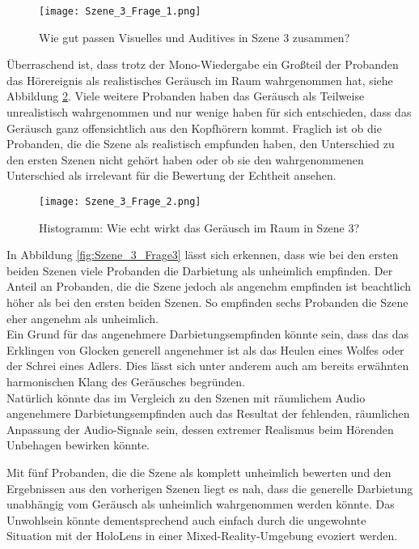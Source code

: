    \begin{figure}[H]
\centering
\texttt{[image: Szene\_3\_Frage\_1.png]}
\caption{Wie gut passen Visuelles und Auditives in Szene 3 zusammen?}
\label{fig:Szene_3_Frage1}
\end{figure} 

Überraschend ist, dass trotz der Mono-Wiedergabe ein Großteil der Probanden das Hörereignis als realistisches Geräusch im Raum wahrgenommen hat, siehe Abbildung \ref{fig:Szene_3_Frage2}. Viele weitere Probanden haben das Geräusch als Teilweise unrealistisch wahrgenommen und nur wenige haben für sich entschieden, dass das Geräusch ganz offensichtlich aus den Kopfhörern kommt. Fraglich ist ob die Probanden, die die Szene als realistisch empfunden haben, den Unterschied zu den ersten Szenen nicht gehört haben oder ob sie den wahrgenommenen Unterschied als irrelevant für die Bewertung der Echtheit ansehen. 

   \begin{figure}[H]
\centering
\texttt{[image: Szene\_3\_Frage\_2.png]}
\caption{Histogramm: Wie echt wirkt das Geräusch im Raum in Szene 3?}
\label{fig:Szene_3_Frage2}
\end{figure} 

In Abbildung \ref{fig:Szene_3_Frage3} lässt sich erkennen, dass wie bei den ersten beiden Szenen viele Probanden die Darbietung als unheimlich empfinden. Der Anteil an Probanden, die die Szene jedoch als angenehm empfinden ist beachtlich höher als bei den ersten beiden Szenen. So empfinden sechs Probanden die Szene eher angenehm als unheimlich. \\

Ein Grund für das angenehmere Darbietungsempfinden könnte sein, dass das das Erklingen von Glocken generell angenehmer ist als das Heulen eines Wolfes oder der Schrei eines Adlers. Dies lässt sich unter anderem auch am bereits erwähnten harmonischen Klang des Geräusches  begründen.  \\

Natürlich könnte das im Vergleich zu den Szenen mit räumlichem Audio angenehmere Darbietungsempfinden auch das Resultat der fehlenden, räumlichen Anpassung der Audio-Signale sein, dessen extremer Realismus beim Hörenden Unbehagen bewirken könnte.

Mit fünf Probanden, die die Szene als komplett unheimlich bewerten und den Ergebnissen aus den vorherigen Szenen liegt es nah, dass die generelle Darbietung unabhängig vom Geräusch als unheimlich wahrgenommen werden könnte. Das Unwohlsein könnte dementsprechend auch einfach durch die ungewohnte Situation mit der HoloLens in einer Mixed-Reality-Umgebung evoziert werden. \\


